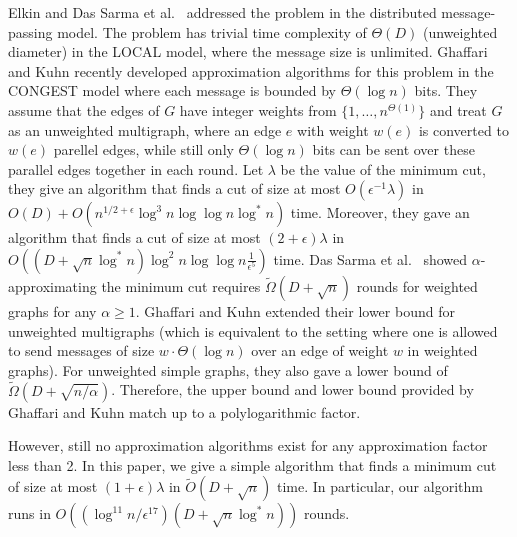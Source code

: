 \documentclass[11pt]{article}
\begin{document}
Elkin \cite{Elkin04} and Das Sarma et al.~\cite{DasSarma12} addressed the problem in the distributed message-passing model. The problem has trivial time complexity of $\Theta(D)$ (unweighted diameter) in the \textsf{LOCAL} model, where the message size is unlimited. Ghaffari and Kuhn \cite{GK13} recently developed approximation algorithms for this problem in the \textsf{CONGEST} model where each message is bounded by $\Theta(\log n)$ bits. They assume that the edges of $G$ have integer weights from $\{1,\ldots, n^{\Theta(1)}\}$ and treat $G$ as an unweighted multigraph, where an edge $e$ with weight $w(e)$ is converted to $w(e)$ parellel edges, while still only $\Theta(\log n)$ bits can be sent over these parallel edges together in each round. Let $\lambda$ be the value of the minimum cut, they give an algorithm that finds a cut of size at most $O(\epsilon^{-1} \lambda)$ in $O(D) + O(n^{1/2+\epsilon} \log^{3} n \log \log n \log^{*} n)$ time. Moreover, they gave an algorithm that finds a cut of size at most $(2+\epsilon)\lambda$ in $O((D+\sqrt{n}\log^{*} n)\log^2 n \log \log n \frac{1}{\epsilon^{5}})$ time. Das Sarma et al.~\cite{DasSarma12} showed $\alpha$-approximating the minimum cut requires $\tilde{\Omega}(D+\sqrt{n})$ rounds for weighted graphs for any $\alpha \geq 1$. Ghaffari and Kuhn extended their lower bound for unweighted multigraphs (which is equivalent to the setting where one is allowed to send messages of size $w \cdot \Theta(\log n)$ over an edge of weight $w$ in weighted graphs). For unweighted simple graphs, they also gave a lower bound of $\tilde{\Omega}(D+\sqrt{n/\alpha})$. Therefore, the upper bound and lower bound provided by Ghaffari and Kuhn match up to a polylogarithmic factor. 

However, still no approximation algorithms exist for any approximation factor less than 2. In this paper, we give a simple algorithm that finds a minimum cut of size at most $(1+\epsilon)\lambda$ in $\tilde{O}(D+\sqrt{n})$ time. In particular, our algorithm runs in $O((\log^{11}n / \epsilon^{17})(D+\sqrt{n}\log^{*} n))$ rounds. 
\end{document}
